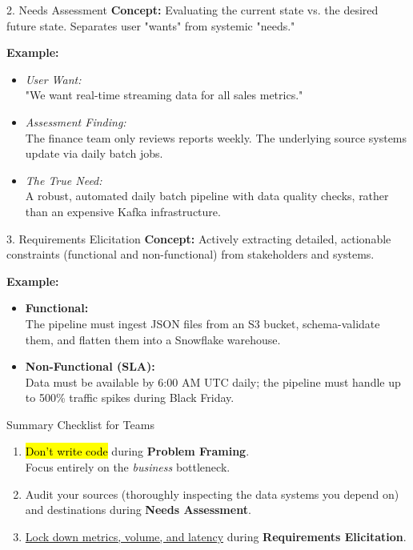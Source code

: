\documentclass[12pt]{beamer}
\begin{document}
\begin{frame}{2. Needs Assessment}
    \textbf{Concept:} Evaluating the current state vs. the desired future state. Separates user "wants" from systemic "needs."
    
    \vspace{0.3cm}
    \textbf{Example:}
    \begin{itemize}
        \item \emph{User Want:}\\"We want real-time streaming data for all sales metrics."
        \item \emph{Assessment Finding:}\\The finance team only reviews reports weekly. The underlying source systems update via daily batch jobs. 
        \item \emph{The True Need:}\\A robust, automated daily batch pipeline with data quality checks, rather than an expensive Kafka infrastructure.
    \end{itemize}
\end{frame}

\begin{frame}{3. Requirements Elicitation}
    \textbf{Concept:} Actively extracting detailed, actionable constraints (functional and non-functional) from stakeholders and systems.
    
    \vspace{0.3cm}
    \textbf{Example:}
    \begin{itemize}
        \item \textbf{Functional:}\\The pipeline must ingest JSON files from an S3 bucket, schema-validate them, and flatten them into a Snowflake warehouse.
        \item \textbf{Non-Functional (SLA):}\\Data must be available by 6:00 AM UTC daily; the pipeline must handle up to 500\% traffic spikes during Black Friday.
    \end{itemize}
\end{frame}

\begin{frame}{Summary Checklist for Teams}
    \begin{enumerate}
        \item \hl{Don't write code} during \textbf{Problem Framing}.\\Focus entirely on the {\it business} bottleneck.
        \item Audit your sources (thoroughly inspecting the data systems you depend on) and destinations during \textbf{Needs Assessment}. 
        \item \ul{Lock down metrics, volume, and latency} during \textbf{Requirements Elicitation}.
    \end{enumerate}
\end{frame}

\end{document}
